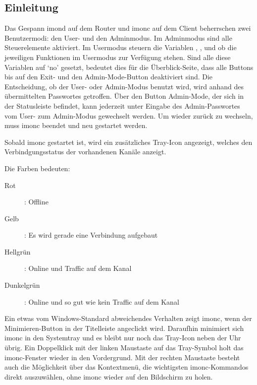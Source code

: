 
  \subsection{Einleitung}

  Das Gespann imond auf dem Router und imonc auf dem Client beherrschen
  zwei Benutzermodi: den User- und den Adminmodus. Im Adminmodus sind alle
  Steuerelemente aktiviert. Im Usermodus steuern die Variablen 
  , , 
   und  ob die
  jeweiligen Funktionen im Usermodus zur Verfügung stehen. Sind alle diese 
  Variablen auf `no' gesetzt, bedeutet dies für die Überblick-Seite, dass alle 
  Buttons bis auf den Exit- und den Admin-Mode-Button deaktiviert sind. Die 
  Entscheidung, ob der User- oder Admin-Modus benutzt wird, wird anhand des 
  übermittelten Passwortes getroffen. Über den Button Admin-Mode, der sich in 
  der Statusleiste befindet, kann jederzeit unter Eingabe des Admin-Passwortes 
  vom User- zum Admin-Modus gewechselt werden. Um wieder zurück zu wechseln, 
  muss imonc beendet und neu gestartet werden.

  Sobald imonc gestartet ist, wird ein zusätzliches Tray-Icon angezeigt, welches 
  den Verbindgungsstatus der vorhandenen Kanäle anzeigt.

  Die Farben bedeuten:
  \begin{description}
    \item[Rot]: Offline
    \item[Gelb]: Es wird gerade eine Verbindung aufgebaut
    \item[Hellgrün]: Online und Traffic auf dem Kanal
    \item[Dunkelgrün]: Online und so gut wie kein Traffic auf dem Kanal
  \end{description}
  
  \noindent Ein etwas vom Windows-Standard abweichendes Verhalten zeigt imonc, wenn der 
  Minimieren-Button in der Titelleiste angeclickt wird. Daraufhin minimiert sich 
  imonc in den Systemtray und es bleibt nur noch das Tray-Icon neben der Uhr 
  übrig. Ein Doppelklick mit der linken Maustaste auf das Tray-Symbol holt das 
  imonc-Fenster wieder in den Vordergrund. Mit der rechten Maustaste besteht 
  auch die Möglichkeit über das Kontextmenü, die wichtigsten imonc-Kommandos 
  direkt auszuwählen, ohne imonc wieder auf den Bildschirm zu holen.

